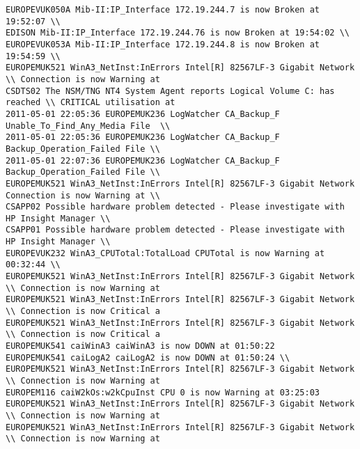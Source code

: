 \begin{lstlisting}
EUROPEVUK050A Mib-II:IP_Interface 172.19.244.7 is now Broken at 19:52:07 \\
EDISON Mib-II:IP_Interface 172.19.244.76 is now Broken at 19:54:02 \\
EUROPEVUK053A Mib-II:IP_Interface 172.19.244.8 is now Broken at 19:54:59 \\
EUROPEMUK521 WinA3_NetInst:InErrors Intel[R] 82567LF-3 Gigabit Network \\ Connection is now Warning at
CSDTS02 The NSM/TNG NT4 System Agent reports Logical Volume C: has reached \\ CRITICAL utilisation at
2011-05-01 22:05:36 EUROPEMUK236 LogWatcher CA_Backup_F Unable_To_Find_Any_Media File  \\
2011-05-01 22:05:36 EUROPEMUK236 LogWatcher CA_Backup_F   Backup_Operation_Failed File \\
2011-05-01 22:07:36 EUROPEMUK236 LogWatcher CA_Backup_F Backup_Operation_Failed File \\
EUROPEMUK521 WinA3_NetInst:InErrors Intel[R] 82567LF-3 Gigabit Network Connection is now Warning at \\
CSAPP02 Possible hardware problem detected - Please investigate with HP Insight Manager \\
CSAPP01 Possible hardware problem detected - Please investigate with HP Insight Manager \\
EUROPEVUK232 WinA3_CPUTotal:TotalLoad CPUTotal is now Warning at 00:32:44 \\
EUROPEMUK521 WinA3_NetInst:InErrors Intel[R] 82567LF-3 Gigabit Network \\ Connection is now Warning at
EUROPEMUK521 WinA3_NetInst:InErrors Intel[R] 82567LF-3 Gigabit Network \\ Connection is now Critical a
EUROPEMUK521 WinA3_NetInst:InErrors Intel[R] 82567LF-3 Gigabit Network \\ Connection is now Critical a
EUROPEMUK541 caiWinA3 caiWinA3 is now DOWN at 01:50:22
EUROPEMUK541 caiLogA2 caiLogA2 is now DOWN at 01:50:24 \\
EUROPEMUK521 WinA3_NetInst:InErrors Intel[R] 82567LF-3 Gigabit Network \\ Connection is now Warning at
EUROPEM116 caiW2kOs:w2kCpuInst CPU 0 is now Warning at 03:25:03
EUROPEMUK521 WinA3_NetInst:InErrors Intel[R] 82567LF-3 Gigabit Network \\ Connection is now Warning at
EUROPEMUK521 WinA3_NetInst:InErrors Intel[R] 82567LF-3 Gigabit Network \\ Connection is now Warning at

\end{lstlisting}
